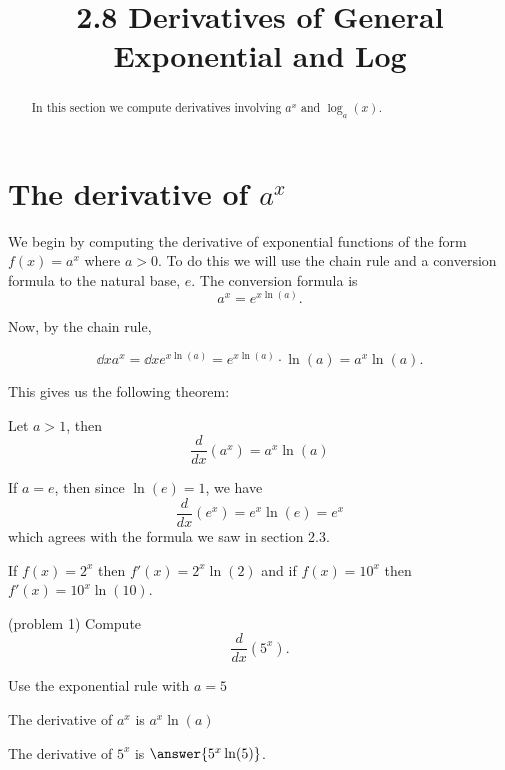 \documentclass[handout]{ximera}
\title{2.8 Derivatives of General Exponential and Log}
\begin{document}
\begin{abstract}
In this section we compute derivatives involving $a^x$ and $\log_a(x)$.
\end{abstract}

\maketitle




\section{The derivative of $a^x$}



We begin by computing the derivative of exponential functions of the form  $f(x) = a^x$ where $a > 0$. 
To do this we will use the chain rule and a conversion formula to the natural base, $e$.
The conversion formula is 
\[
a^x = e^{x\ln(a)}.
\]

Now, by the chain rule,

\[
\dd{x} a^x = \dd{x} e^{x\ln(a)}  = e^{x\ln(a)}\cdot \ln(a) = a^x \ln(a).
\]

This gives us the following theorem:

\begin{theorem}
Let $a >1$, then
\[
\frac{d}{dx}\left(a^x\right) = a^x \ln (a)
\]
\end{theorem}

\begin{remark}
If $a = e$, then since $\ln(e) = 1$, we have 
\[
\frac{d}{dx}\left(e^x\right) = e^x \ln (e) =e^x
\]
which agrees with the formula we saw in section 2.3.
\end{remark}


\begin{example}[example 1]
If $f(x) = 2^x$ then $f'(x) = 2^x \ln(2)$
and if $f(x) = 10^x$ then $f'(x) = 10^x \ln(10)$.
\end{example}



\begin{problem}(problem 1)
Compute
\[
\frac{d}{dx} \left(5^x\right).
\]
\begin{hint}
Use the exponential rule with $a = 5$
\end{hint}
\begin{hint}
The derivative of $a^x$ is $a^x\ln(a)$
\end{hint}
The derivative of $5^x$ is $\answer{5^x\ln(5)}$.
\end{problem}
\end{document}
